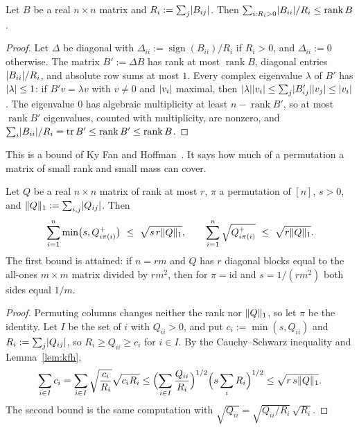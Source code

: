 \begin{lemma}\label{lem:kfh}
Let $B$ be a real $n\times n$ matrix and $R_i:=\sum_j\lvert B_{ij}\rvert$. Then $\sum_{i:R_i>0}\lvert B_{ii}\rvert/R_i\le\operatorname{rank}B$.
\end{lemma}

\begin{proof}
Let $\Delta$ be diagonal with $\Delta_{ii}:=\operatorname{sign}(B_{ii})/R_i$ if $R_i>0$, and $\Delta_{ii}:=0$ otherwise. The matrix $B':=\Delta B$ has rank at most $\operatorname{rank}B$, diagonal entries $\lvert B_{ii}\rvert/R_i$, and absolute row sums at most $1$. Every complex eigenvalue $\lambda$ of $B'$ has $\lvert \lambda\rvert\le1$: if $B'v=\lambda v$ with $v\ne0$ and $\lvert v_i\rvert$ maximal, then $\lvert \lambda\rvert\lvert v_i\rvert\le\sum_j\lvert B'_{ij}\rvert\lvert v_j\rvert\le\lvert v_i\rvert$. The eigenvalue $0$ has algebraic multiplicity at least $n-\operatorname{rank}B'$, so at most $\operatorname{rank}B'$ eigenvalues, counted with multiplicity, are nonzero, and $\sum_i\lvert B_{ii}\rvert/R_i=\operatorname{tr}B'\le\operatorname{rank}B'\le\operatorname{rank}B$.
\end{proof}

This is a bound of Ky Fan and Hoffman~\cite{FanHoffman53}. It says how much of a permutation a matrix of small rank and small mass can cover.

\begin{lemma}\label{lem:block-one}
Let $Q$ be a real $n\times n$ matrix of rank at most $r$, $\pi$ a permutation of $[n]$, $s>0$, and $\lVert Q\rVert_1:=\sum_{i,j}\lvert Q_{ij}\rvert$. Then
\[
  \sum_{i=1}^n\min\bigl(s,Q^+_{i\pi(i)}\bigr)\ \le\ \sqrt{s\,r\norm Q_1},\qquad\sum_{i=1}^n\sqrt{Q^+_{i\pi(i)}}\ \le\ \sqrt{r\norm Q_1}.
\]
The first bound is attained: if $n=rm$ and $Q$ has $r$ diagonal blocks equal to the all-ones $m\times m$ matrix divided by $rm^2$, then for $\pi=\mathrm{id}$ and $s=1/(rm^2)$ both sides equal $1/m$.
\end{lemma}

\begin{proof}
Permuting columns changes neither the rank nor $\lVert Q\rVert_1$, so let $\pi$ be the identity. Let $I$ be the set of $i$ with $Q_{ii}>0$, and put $c_i:=\min(s,Q_{ii})$ and $R_i:=\sum_j\lvert Q_{ij}\rvert$, so $R_i\ge Q_{ii}\ge c_i$ for $i\in I$. By the Cauchy--Schwarz inequality and Lemma~\ref{lem:kfh},
\[
  \sum_{i\in I}c_i=\sum_{i\in I}\sqrt{\frac{c_i}{R_i}}\sqrt{c_iR_i}\le\Bigl(\sum_{i\in I}\frac{Q_{ii}}{R_i}\Bigr)^{1/2}\Bigl(s\sum_iR_i\Bigr)^{1/2}\le\sqrt{r\,s\lVert Q\rVert_1}.
\]
The second bound is the same computation with $\sqrt{Q_{ii}}=\sqrt{Q_{ii}/R_i}\,\sqrt{R_i}$.
\end{proof}

